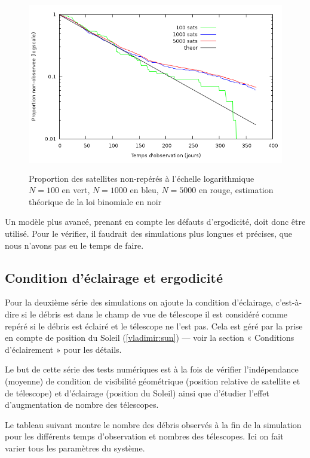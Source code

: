 \begin{figure}[ht] \centering
      \includegraphics*[height=3in]{stat_log.png}
      \caption{
            \label{vladimir:stat_log}
  Proportion des satellites non-rep\'er\'es \`a l'\'echelle logarithmique $N = 100$ en vert, $N = 1000$ en bleu, $N = 5000$ en rouge, estimation th\'eorique
  de la loi binomiale en noir}
 \end{figure}

Un modèle plus avancé, prenant en compte les défauts d'ergodicité,
doit donc être utilisé. Pour le vérifier, il faudrait des simulations
plus longues et précises, que nous n'avons pas eu le temps de faire.  
\subsection{Condition d'\'eclairage et ergodicit\'e}  
Pour la deuxi\`eme s\'erie des simulations on ajoute la condition d'\'eclairage, c'est-\`a-dire 
si le d\'ebris est dans le champ de vue de t\'elescope il est consid\'er\'e comme rep\'er\'e
si le d\'ebris est \'eclair\'e et le t\'elescope ne l'est pas. Cela est g\'er\'e par la prise 
en compte de position du Soleil (\autoref{vladimir:sun}) --- voir la section 
« Conditions d'\'eclairement » pour les d\'etails. 

Le but de cette s\'erie des tests num\'eriques est \`a la fois de v\'erifier 
l'ind\'ependance (moyenne) de condition de visibilit\'e g\'eom\'etrique (position
relative de satellite et de t\'elescope) et d'\'eclairage (position
du Soleil) ainsi que d'\'etudier l'effet d'augmentation de nombre des
t\'elescopes. 

Le tableau suivant montre le nombre des d\'ebris observ\'es
\`a la fin de la simulation pour les diff\'erents temps d'observation et nombres des
t\'elescopes. Ici on fait varier tous les param\`etres du syst\`eme.

